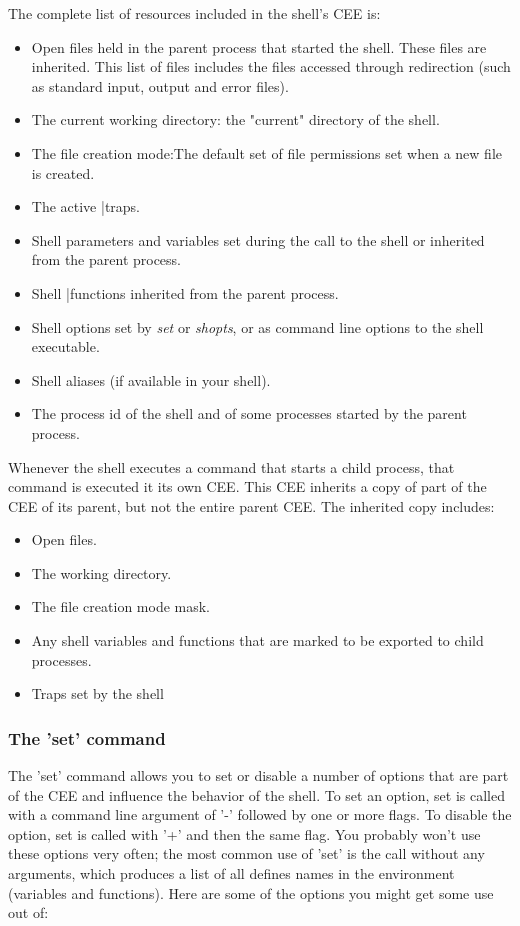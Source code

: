 The complete list of resources included in the shell's CEE is:
\begin{itemize}
\setlength{\leftmargin}{0pt}
\setlength{\itemsep}{0pt}
\setlength{\parsep}{0pt}
\setlength{\parskip}{0pt}
\item Open files held in the parent process that started the shell. These files
are inherited. This list of files includes the files accessed through
redirection (such as standard input, output and error files).
\item The current working directory: the "current" directory of the shell.
\item The file creation mode:The default set of file permissions set when a new
file is created.
\item The active |traps.
\item Shell parameters and variables set during the call to the shell or
inherited from the parent process.
\item Shell |functions inherited from the parent process.
\item Shell options set by \textit{set} or \textit{shopts}, or as command line
options to the shell executable.
\item Shell aliases (if available in your shell).
\item The process id of the shell and of some processes started by the parent
process.
\end{itemize}

Whenever the shell executes a command that starts a child process, that command
is executed it its own CEE. This CEE inherits a copy of part of the CEE of its
parent, but not the entire parent CEE. The inherited copy includes:

\begin{itemize}
\setlength{\leftmargin}{0pt}
\setlength{\itemsep}{0pt}
\setlength{\parsep}{0pt}
\setlength{\parskip}{0pt}
\item Open files.
\item The working directory.
\item The file creation mode mask.
\item Any shell variables and functions that are marked to be exported to child processes.
\item Traps set by the shell
\end{itemize}

\subsubsection{The 'set' command}
The 'set' command allows you to set or disable a number of options that are
part of the CEE and influence the behavior of the shell. To set an option, set
is called with a command line argument of '-' followed by one or more flags. To
disable the option, set is called with '+' and then the same flag. You probably
won't use these options very often; the most common use of 'set' is the call
without any arguments, which produces a list of all defines names in the
environment (variables and functions). Here are some of the options you might
get some use out of:

